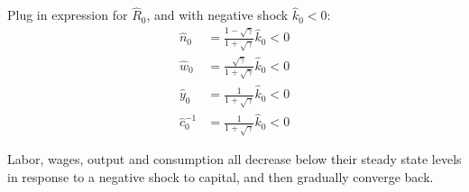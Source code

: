 \documentclass{article}
\begin{document}
\begin{enumerate}
Plug in expression for $\hat{R}_0$, and with negative shock
$\hat{k}_0<0$:
\begin{align*}
  \hat{n}_0&=\frac{1-\sqrt{\gamma}}{1+\sqrt{\gamma}}\hat{k}_0<0\\
  \hat{w}_0&=\frac{\sqrt{\gamma}}{1+\sqrt{\gamma}}\hat{k}_0<0\\
  \hat{y}_0&=\frac{1}{1+\sqrt{\gamma}}\hat{k}_0<0\\
  \hat{c}_0^{-1}&=\frac{1}{1+\sqrt{\gamma}}\hat{k}_0<0
\end{align*}

Labor, wages, output and consumption all decrease below their steady
state levels in response to a negative shock to capital, and then
gradually converge back.

\end{enumerate}
\end{document}

